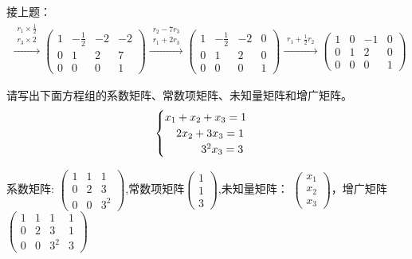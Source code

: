 \documentclass[a4paper]{report}
\begin{document}
\begin{jie}
接上题：
\begin{align*}
\xrightarrow{\substack{ r_{1}\times \frac{1}{2}\\ r_3\times 2}}
{
\begin{pmatrix}
1&-\frac{1}{2}&-2&-2\\
0&1&2&7\\
0&0&0&1
\end{pmatrix}
}\xrightarrow{\substack{ r_{2}-7r_3\\ r_1+2r_3}}
{
\begin{pmatrix}
1&-\frac{1}{2}&-2&0\\
0&1&2&0\\
0&0&0&1
\end{pmatrix}
}\xrightarrow{\substack{ r_{1}+\frac{1}{2}r_2}}
{
\begin{pmatrix}
1&0&-1&0\\
0&1&2&0\\
0&0&0&1
\end{pmatrix}
}
\end{align*}
\end{jie}

\EX 请写出下面方程组的系数矩阵、常数项矩阵、未知量矩阵和增广矩阵。
\begin{equation*}
\begin{cases}
x_{1}+x_{2}+x_{3} = 1&\\
\hphantom{x_{1}} 2x_{2}+3x_{3} = 1&\\
\hphantom{x_{1}+x_{2}}3^2x_{3} = 3&
\end{cases}
\end{equation*}

\begin{jie}
系数矩阵:
$
\begin{pmatrix}
1&1&1\\ 0&2&3\\0&0&3^2
\end{pmatrix}
$,常数项矩阵$
\begin{pmatrix}
1\\ 1\\ 3
\end{pmatrix}
$,未知量矩阵：
$
\begin{pmatrix}
x_1\\ x_2\\ x_3
\end{pmatrix}
$，增广矩阵
$
\begin{pmatrix}
1&1&1&1\\ 0&2&3&1\\0&0&3^2&3
\end{pmatrix}
$
\end{jie}
\end{document}
